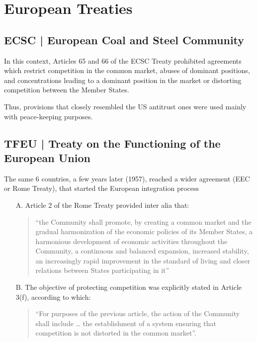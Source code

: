 \section{European Treaties}

    \subsection{ECSC | European Coal and Steel Community}

        In this context, Articles 65 and 66 of the ECSC Treaty prohibited agreements which restrict competition in the common market, abuses of dominant positions, and concentrations leading to a dominant position in the market or distorting competition between the Member States.

        Thus, provisions that closely resembled the US antitrust ones were used mainly with peace-keeping purposes. 

    \subsection{TFEU | Treaty on the Functioning of the European Union}

        The same 6 countries, a few years later (1957), reached a wider agreement (EEC or Rome Treaty), that started the European integration process
        \begin{itemize}
            \item[A.] Article 2 of the Rome Treaty provided inter alia that: 
            \begin{quote}
                “the Community shall promote, by creating a common market and the gradual harmonization of the economic policies of its Member States, a harmonious development of economic activities throughout the Community, a continuous and balanced expansion, increased stability, an increasingly rapid improvement in the standard of living and closer relations between States participating in it”
            \end{quote}
            \item[B.] The objective of protecting competition was explicitly stated in Article 3(f), according to which:
            \begin{quote}
                “For purposes of the previous article, the action of the Community shall include … the establishment of a system ensuring that competition is not distorted in the common market”. 
            \end{quote}
        \end{itemize}

